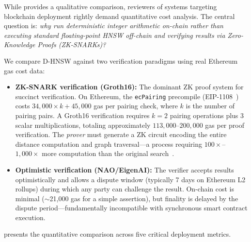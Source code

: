 \documentclass[10pt,journal]{IEEEtran}
\newcommand{\dhnsw}{\textsc{D-HNSW}}
\begin{document}
While  provides a qualitative comparison, reviewers of systems targeting blockchain deployment rightly demand quantitative cost analysis. The central question is: \emph{why run deterministic integer arithmetic on-chain rather than executing standard floating-point HNSW off-chain and verifying results via Zero-Knowledge Proofs (ZK-SNARKs)?}

We compare \dhnsw{} against two verification paradigms using real Ethereum gas cost data:

\begin{itemize}[leftmargin=*]
  \item \textbf{ZK-SNARK verification (Groth16):} The dominant ZK proof system for succinct verification. On Ethereum, the \texttt{ecPairing} precompile (EIP-1108~\cite{eip1108}) costs $34{,}000 \times k + 45{,}000$ gas per pairing check, where $k$ is the number of pairing pairs. A Groth16 verification requires $k=2$ pairing operations plus 3 scalar multiplications, totaling approximately $113{,}000$--$200{,}000$ gas per proof verification. The \emph{prover} must generate a ZK circuit encoding the entire distance computation and graph traversal---a process requiring $100\times$--$1{,}000\times$ more computation than the original search~\cite{lu2024annproof}.
  \item \textbf{Optimistic verification (NAO/EigenAI):} The verifier accepts results optimistically and allows a dispute window (typically 7 days on Ethereum L2 rollups) during which any party can challenge the result. On-chain cost is minimal ($\sim$21{,}000 gas for a simple assertion), but finality is delayed by the dispute period---fundamentally incompatible with synchronous smart contract execution.
\end{itemize}

 presents the quantitative comparison across five critical deployment metrics.
\end{document}
